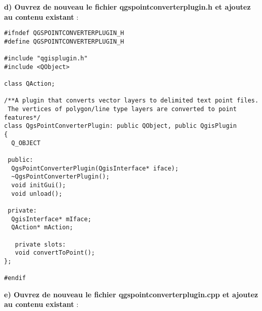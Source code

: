 \textbf{d) Ouvrez de nouveau le fichier qgspointconverterplugin.h et ajoutez au 
contenu existant} :

\begin{verbatim}
#ifndef QGSPOINTCONVERTERPLUGIN_H
#define QGSPOINTCONVERTERPLUGIN_H

#include "qgisplugin.h"
#include <QObject>

class QAction;

/**A plugin that converts vector layers to delimited text point files.
 The vertices of polygon/line type layers are converted to point features*/
class QgsPointConverterPlugin: public QObject, public QgisPlugin
{
  Q_OBJECT

 public:
  QgsPointConverterPlugin(QgisInterface* iface);
  ~QgsPointConverterPlugin();
  void initGui();
  void unload();
  
 private:
  QgisInterface* mIface;
  QAction* mAction;
  
   private slots:
   void convertToPoint();
};

#endif
\end{verbatim}

\textbf{e) Ouvrez de nouveau le fichier qgspointconverterplugin.cpp et ajoutez 
au contenu existant} :

